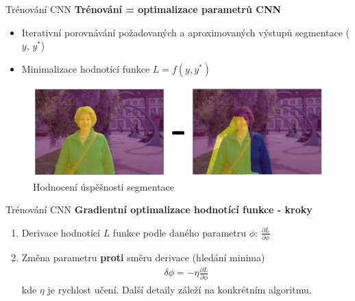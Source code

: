 \documentclass[aspectratio=1610]{beamer}
\begin{document}
\begin{frame}{Trénování CNN}
\textbf{Trénování = optimalizace parametrů CNN}

\begin{itemize}
	\item Iterativní porovnávání požadovaných a aproximovaných výstupů segmentace ($ y $, $ y^* $)
	\item Minimalizace hodnotící funkce $ L = f(y,y^*) $ 
\end{itemize}
\vspace{5mm}
\begin{figure}[h]
	\begin{center}
		\includegraphics[width=12cm, keepaspectratio]{comp.png}
	\end{center}
	\caption{Hodnocení úspěšnosti segmentace} 	
\end{figure}

\end{frame}
\begin{frame}{Trénování CNN}
\textbf{Gradientní optimalizace hodnotící funkce - kroky}

\begin{enumerate}
	\item Derivace hodnotící $ L $ funkce podle daného parametru $ \phi $: $ \frac{\partial L}{\partial \phi} $
	\item Změna parametru \textbf{proti} směru derivace (hledání minima)
	\begin{gather}
	\delta \phi = - \eta \frac{\partial L}{\partial \phi}
	\end{gather}	
	\noindent kde $ \eta $ je rychlost učení. Další detaily záleží na konkrétním algoritmu.

\end{enumerate}

\end{frame}
\end{document}
